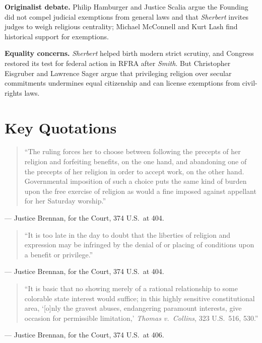 \documentclass[12pt]{article}
\begin{document}
\textbf{Originalist debate.} Philip Hamburger and Justice Scalia argue the Founding did not compel judicial exemptions from general laws and that \textit{Sherbert} invites judges to weigh religious centrality; Michael McConnell and Kurt Lash find historical support for exemptions.

\textbf{Equality concerns.} \textit{Sherbert} helped birth modern strict scrutiny, and Congress restored its test for federal action in RFRA after \textit{Smith}. But Christopher Eisgruber and Lawrence Sager argue that privileging religion over secular commitments undermines equal citizenship and can license exemptions from civil-rights laws.

\section{Key Quotations}

\begin{quote}
``The ruling forces her to choose between following the precepts of her religion and forfeiting benefits, on the one hand, and abandoning one of the precepts of her religion in order to accept work, on the other hand. Governmental imposition of such a choice puts the same kind of burden upon the free exercise of religion as would a fine imposed against appellant for her Saturday worship.''
\end{quote}
\noindent --- Justice Brennan, for the Court, 374 U.S.\ at 404.

\begin{quote}
``It is too late in the day to doubt that the liberties of religion and expression may be infringed by the denial of or placing of conditions upon a benefit or privilege.''
\end{quote}
\noindent --- Justice Brennan, for the Court, 374 U.S.\ at 404.

\begin{quote}
``It is basic that no showing merely of a rational relationship to some colorable state interest would suffice; in this highly sensitive constitutional area, `[o]nly the gravest abuses, endangering paramount interests, give occasion for permissible limitation,' \textit{Thomas v.\ Collins}, 323 U.S.\ 516, 530.''
\end{quote}
\noindent --- Justice Brennan, for the Court, 374 U.S.\ at 406.
\end{document}

